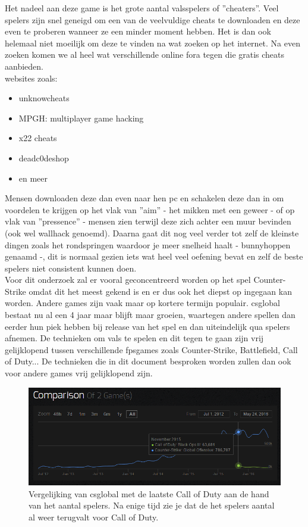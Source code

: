 \documentclass[pdftex,a4paper,12pt,twoside]{report}
\begin{document}
Het nadeel aan deze game is het grote aantal valsspelers of ''\gls{cheat}ers''. Veel spelers zijn snel geneigd om een van de veelvuldige \gls{cheat}s te downloaden en deze even te proberen wanneer ze een minder moment hebben. Het is dan ook helemaal niet moeilijk om deze te vinden na wat zoeken op het internet. Na even zoeken komen we al heel wat verschillende online fora tegen die gratis \gls{cheat}s aanbieden.
\\

websites zoals: 
\begin{itemize}
\item unknowcheats
\item MPGH: multiplayer game hacking
\item x22 cheats 
\item deadc0deshop
\item en meer
\\
\end{itemize}


 Mensen downloaden deze dan even naar hen pc en schakelen deze dan in om voordelen te krijgen op het vlak van ''\gls{aim}'' - het mikken met een geweer - of op vlak van ''pressence'' - mensen zien terwijl deze zich achter een muur bevinden (ook wel wallhack genoemd). Daarna gaat dit nog veel verder tot zelf de kleinste dingen zoals het rondspringen waardoor je meer snelheid haalt - bunnyhoppen genaamd -, dit is normaal gezien iets wat heel veel oefening bevat en zelf de beste spelers niet consistent kunnen doen. 
\\

Voor dit onderzoek zal er vooral geconcentreerd worden op het spel Counter-Strike omdat dit het meest gekend is en er dus ook het diepst op ingegaan kan worden. Andere games zijn vaak maar op kortere termijn populair. \gls{csglobal} bestaat nu al een 4 jaar maar blijft maar groeien, waartegen andere spellen dan eerder hun piek hebben bij release van het spel en dan uiteindelijk qua spelers afnemen. De technieken om vals te spelen en dit tegen te gaan zijn vrij gelijklopend tussen verschillende \gls{fpsgames} zoals Counter-Strike, Battlefield, Call of Duty... De technieken die in dit document besproken worden zullen dan ook voor andere games vrij gelijklopend zijn.
\\

\newpage

\begin{figure}[H]
\centering
\includegraphics[width=15cm]{img/csgovsbo3}
\caption{Vergelijking van \gls{csglobal} met de laatste Call of Duty aan de hand van het aantal spelers. Na enige tijd zie je dat de het spelers aantal al weer terugvalt voor Call of Duty. \citep{steamcharts}}
\end{figure} 
\end{document}
